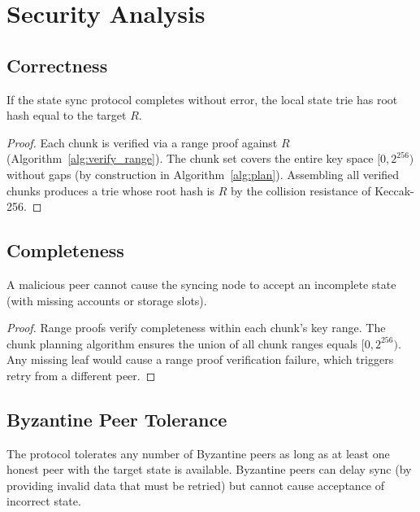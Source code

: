 \section{Security Analysis}
\label{sec:security}

\subsection{Correctness}

\begin{theorem}
If the state sync protocol completes without error, the local state trie has root hash equal to the target $R$.
\end{theorem}

\begin{proof}
Each chunk is verified via a range proof against $R$ (Algorithm~\ref{alg:verify_range}). The chunk set covers the entire key space $[0, 2^{256})$ without gaps (by construction in Algorithm~\ref{alg:plan}). Assembling all verified chunks produces a trie whose root hash is $R$ by the collision resistance of Keccak-256.
\end{proof}

\subsection{Completeness}

\begin{theorem}
A malicious peer cannot cause the syncing node to accept an incomplete state (with missing accounts or storage slots).
\end{theorem}

\begin{proof}
Range proofs verify completeness within each chunk's key range. The chunk planning algorithm ensures the union of all chunk ranges equals $[0, 2^{256})$. Any missing leaf would cause a range proof verification failure, which triggers retry from a different peer.
\end{proof}

\subsection{Byzantine Peer Tolerance}

The protocol tolerates any number of Byzantine peers as long as at least one honest peer with the target state is available. Byzantine peers can delay sync (by providing invalid data that must be retried) but cannot cause acceptance of incorrect state.

